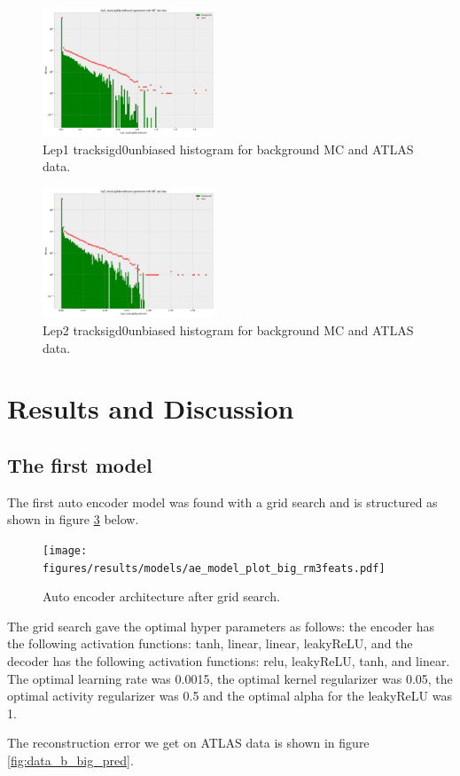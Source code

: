 \documentclass[ reprint, amsmath,amssymb, aps, nofootinbib]{revtex4-2}
\begin{document}
\begin{figure}[H]
    \centering
    \includegraphics[width=0.46\textwidth]{figures/implementation/lep1_tracksigd0pvunbiased.pdf}
    \caption{Lep1 tracksigd0unbiased histogram for background MC and ATLAS data. }
    \label{fig:lep1sigd0}
\end{figure}

\begin{figure}[H]
    \centering
    \includegraphics[width=0.46\textwidth]{figures/implementation/lep2_tracksigd0pvunbiased.pdf}
    \caption{Lep2 tracksigd0unbiased histogram for background MC and ATLAS data.}
    \label{fig:lep2sigd0}
\end{figure}

\newpage
\section{Results and Discussion}

\subsection{The first model}

The first auto encoder model was found with a grid search and is structured as shown in figure \ref{fig:big_ae_plot} below. 

\begin{figure}[h]
    \centering
    \texttt{[image: figures/results/models/ae\_model\_plot\_big\_rm3feats.pdf]}
    \caption{Auto encoder architecture after grid search. }
    \label{fig:big_ae_plot}
\end{figure}
The grid search gave the optimal hyper parameters as follows: the encoder has the following activation functions: tanh, linear, linear, leakyReLU, and the decoder has the following activation functions: relu, leakyReLU, tanh, and linear. The optimal learning rate was 0.0015, the optimal kernel regularizer was 0.05, the optimal activity regularizer was 0.5 and the optimal alpha for the leakyReLU was 1. \par 
The reconstruction error we get on ATLAS data is shown in figure \ref{fig:data_b_big_pred}.
\end{document}
